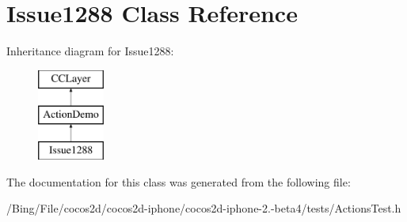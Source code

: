 \hypertarget{interface_issue1288}{\section{Issue1288 Class Reference}
\label{interface_issue1288}
}
Inheritance diagram for Issue1288\-:\begin{figure}[H]
\begin{center}
\leavevmode
\includegraphics[height=3.000000cm]{interface_issue1288}
\end{center}
\end{figure}


The documentation for this class was generated from the following file\-:\begin{DoxyCompactItemize}
\item 
/\-Bing/\-File/cocos2d/cocos2d-\/iphone/cocos2d-\/iphone-\/2.-\/beta4/tests/Actions\-Test.\-h\end{DoxyCompactItemize}
